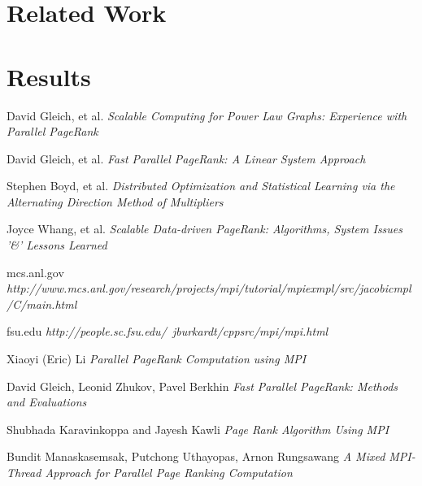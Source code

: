 \documentclass[a4paper,10pt]{article}
\begin{document}
\section{Related Work}


\section{Results}

\begin{thebibliography}{1}

 David Gleich, et al. {\em Scalable Computing for Power Law Graphs: Experience with Parallel PageRank}

 David Gleich, et al. {\em Fast Parallel PageRank: A Linear System Approach} 

 Stephen Boyd, et al. {\em Distributed Optimization and Statistical Learning via the Alternating Direction Method of Multipliers} 

 Joyce Whang, et al. {\em Scalable Data-driven PageRank: Algorithms, System Issues '\&' Lessons Learned}
 
  mcs.anl.gov {\em http://www.mcs.anl.gov/research/projects/mpi/tutorial/mpiexmpl/src/jacobicmpl/C/main.html}
 
  fsu.edu {\em http://people.sc.fsu.edu/~jburkardt/cppsrc/mpi/mpi.html}

  Xiaoyi (Eric) Li  {\em Parallel PageRank Computation using MPI}

  David Gleich, Leonid Zhukov, Pavel Berkhin  {\em Fast Parallel PageRank: Methods and Evaluations}

  Shubhada Karavinkoppa and Jayesh Kawli  {\em Page Rank Algorithm Using MPI}

  Bundit Manaskasemsak, Putchong Uthayopas, Arnon Rungsawang {\em A Mixed MPI-Thread Approach for Parallel Page Ranking Computation}

\end{thebibliography}
\end{document}
